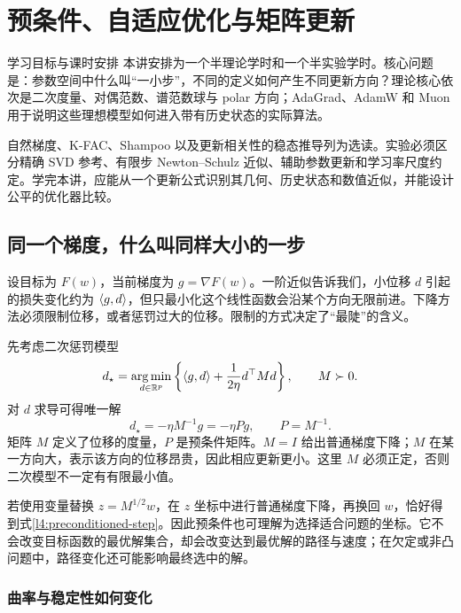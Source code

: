 \chapter{预条件、自适应优化与矩阵更新}
\label{l4:chapter}

\begin{coursebox}{学习目标与课时安排}
本讲安排为一个半理论学时和一个半实验学时。核心问题是：参数空间中什么叫“一小步”，不同的定义如何产生不同更新方向？理论核心依次是二次度量、对偶范数、谱范数球与 polar 方向；AdaGrad、AdamW 和 Muon 用于说明这些理想模型如何进入带有历史状态的实际算法。

自然梯度、K-FAC、Shampoo 以及更新相关性的稳态推导列为选读。实验必须区分精确 SVD 参考、有限步 Newton--Schulz 近似、辅助参数更新和学习率尺度约定。学完本讲，应能从一个更新公式识别其几何、历史状态和数值近似，并能设计公平的优化器比较。
\end{coursebox}

\section{同一个梯度，什么叫同样大小的一步}
\label{l4:metric}

设目标为 $F(w)$，当前梯度为 $g=\nabla F(w)$。一阶近似告诉我们，小位移 $d$ 引起的损失变化约为 $\left\langle g,d\right\rangle$，但只最小化这个线性函数会沿某个方向无限前进。下降方法必须限制位移，或者惩罚过大的位移。限制的方式决定了“最陡”的含义。

先考虑二次惩罚模型
\begin{equation}
 d_\star=\operatorname*{arg\,min}_{d\in\mathbb R^p}
 \left\{\left\langle g,d\right\rangle+\frac1{2\eta}d^\top M d\right\},
 \qquad M\succ0.
 \label{l4:quadratic-model}
\end{equation}
对 $d$ 求导可得唯一解
\begin{equation}
 \boxed{d_\star=-\eta M^{-1}g=-\eta Pg},\qquad P=M^{-1}.
 \label{l4:preconditioned-step}
\end{equation}
矩阵 $M$ 定义了位移的度量，$P$ 是预条件矩阵。$M=I$ 给出普通梯度下降；$M$ 在某一方向大，表示该方向的位移昂贵，因此相应更新更小。这里 $M$ 必须正定，否则二次模型不一定有有限最小值。

若使用变量替换 $z=M^{1/2}w$，在 $z$ 坐标中进行普通梯度下降，再换回 $w$，恰好得到式\eqref{l4:preconditioned-step}。因此预条件也可理解为选择适合问题的坐标。它不会改变目标函数的最优解集合，却会改变达到最优解的路径与速度；在欠定或非凸问题中，路径变化还可能影响最终选中的解。

\subsection{曲率与稳定性如何变化}

